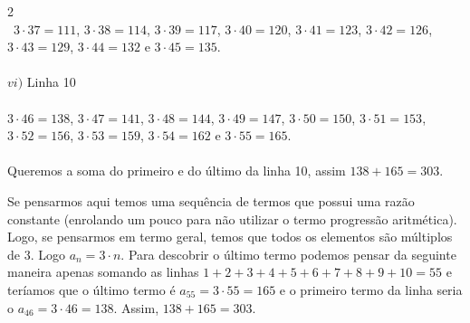 \begin{solucoes}{2}
\\\
       $3\cdot 37=111$, $3\cdot 38=114$, $3\cdot 39=117$, $3\cdot 40=120$, $3\cdot 41=123$, $3\cdot 42=126$, $3\cdot 43=129$, $3\cdot 44=132$ e $3\cdot45=135$.
\\\\
    $vi)$ Linha 10
\\\\
    $3\cdot 46=138$, $3\cdot 47=141$, $3\cdot 48=144$, $3\cdot 49=147$, $3\cdot 50=150$, $3\cdot 51=153$, $3\cdot 52=156$, $3\cdot 53=159$, $3\cdot 54=162$ e $3\cdot 55=165$.
\\\\
Queremos a soma do primeiro e do último da linha 10, assim $138+165=303$.

\solucao
Se pensarmos aqui temos uma sequência de termos que possui uma razão constante (enrolando um pouco para não utilizar o termo progressão aritmética). Logo, se pensarmos em termo geral, temos que todos os elementos são múltiplos de 3. Logo $a_n=3\cdot n$. Para descobrir o último termo podemos pensar da seguinte maneira apenas somando as linhas $1+2+3+4+5+6+7+8+9+10=55$ e teríamos que o último termo é $a_{55}=3\cdot 55=165$ e o primeiro termo da linha seria o $a_{46}=3\cdot 46=138$. Assim, $138+165=303$.

\end{solucoes}

